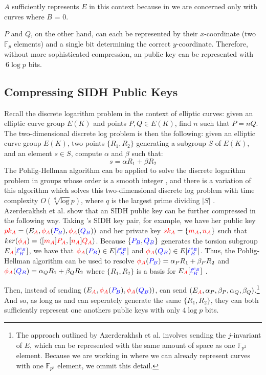 $A$ sufficiently represents $E$ in this context because in \sidh we are concerned only with curves where $B$ = 0. 

$P$ and $Q$, on the other hand, can each be represented by their $x$-coordinate (two $\mathbb{F}_{p}$ elements) and a single bit determining the correct $y$-coordinate. Therefore, without more sophisticated compression, an \sidh public key can be represented with $~6\log p$ bits.

\subsection{Compressing SIDH Public Keys}
\label{subsec:azercompression}

Recall the discrete logarithm problem in the context of elliptic curves: given an elliptic curve group $E(K)$ and points $P, Q \in E(K)$, find $n$ such that $P = nQ$. The two-dimensional discrete log problem is then the following: given an elliptic curve group $E(K)$, two points $\{R_1, R_2\}$ generating a subgroup $S$ of $E(K)$, and an element $s \in S$, compute $\alpha$ and $\beta$ such that:
$$
s = \alpha R_1 + \beta R_2
$$
The Pohlig-Hellman algorithm can be applied to solve the discrete logarithm problem in groups whose order is a smooth integer \cite{ph}, and there is a variation of this algorithm which solves this two-dimensional discrete log problem with time complexity $O(\sqrt[q]\log p)$, where $q$ is the largest prime dividing $\vert S\vert$ \cite{genph}.\\

\noindent
Azerderakhsh et al. show that an SIDH public key can be further compressed in the following way. Taking \alice's SIDH key pair, for example, we have her public key $\textcolor{red}{pk_A} = (E_{\textcolor{red}{A}}, \textcolor{red}{\phi_A}(\textcolor{blue}{P_B}),\textcolor{red}{\phi_A}(\textcolor{blue}{Q_B}))$ and her private key $\textcolor{red}{sk_A} = \{\textcolor{red}{m_A}, \textcolor{red}{n_A}\}$ such that $ker(\textcolor{red}{\phi_A}) = \langle [\textcolor{red}{m_A}]\textcolor{red}{P_A}, [\textcolor{red}{n_A}]\textcolor{red}{Q_A}\rangle$. Because $\{\textcolor{blue}{P_B}, \textcolor{blue}{Q_B}\}$ generates the torsion subgroup $E_{\textcolor{red}{A}}[\textcolor{blue}{\ell_{B}^{e_B}}]$, we have that $\textcolor{red}{\phi_A}(\textcolor{blue}{P_B}) \in E[\textcolor{blue}{\ell_{B}^{e_B}}]$ and $\textcolor{red}{\phi_A}(\textcolor{blue}{Q_B}) \in E[\textcolor{blue}{\ell_{B}^{e_B}}]$. Thus, the Pohlig-Hellman algorithm can be used to resolve $\textcolor{red}{\phi_A}(\textcolor{blue}{P_B}) = \alpha_P R_1 + \beta_P R_2$ and $\textcolor{red}{\phi_A}(\textcolor{blue}{Q_B}) = \alpha_Q R_1 + \beta_Q R_2$ where $\{R_1, R_2\}$ is a basis for $E_{\textcolor{red}{A}}[\textcolor{blue}{\ell_{B}^{e_B}}]$ \cite{compwr}.

Then, instead of sending \bob $(E_{\textcolor{red}{A}}, \textcolor{red}{\phi_A}(\textcolor{blue}{P_B}),\textcolor{red}{\phi_A}(\textcolor{blue}{Q_B}))$, \alice can send $(E_{\textcolor{red}{A}}, \alpha_P, \beta_P, \alpha_Q, \beta_Q)$.\footnote{The approach outlined by Azerderakhsh et al. involves sending the $j$-invariant of $E$, which can be represented with the same amount of space as one $\mathbb{F}_{p^2}$ element. Because we are working in \sidh where we can already represent curves with one $\mathbb{F}_{p^2}$ element, we ommit this detail.} And so, as long as \alice and \bob can seperately generate the same $\{R_1, R_2\}$, they can both sufficiently represent one anothers public keys with only $4\log p$ bits.\\

